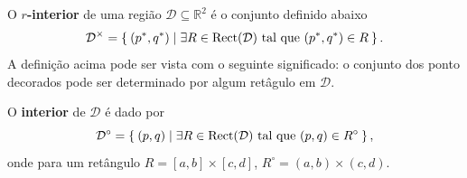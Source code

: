 O \textbf{$r$-interior} de uma região $\mathcal{D} \subseteq \mathbb{R}^2$ é o conjunto definido abaixo
\begin{equation*}
    \mathcal{D}^\times = \Set{(p^*, q^*) | \exists R \in \text{Rect}(\mathcal{D}) \text{ tal que }
    (p^*, q^*) \in R}.
\end{equation*}
A definição acima pode ser vista com o seguinte significado: o conjunto dos ponto decorados pode ser 
determinado por algum retâgulo em $\mathcal{D}$. 

O \textbf{interior} de $\mathcal{D}$ é dado por 
\begin{equation*}
    \mathcal{D}^\circ = \Set{(p,q) | \exists R \in \text{Rect}(\mathcal{D}) \text{ tal que } 
    (p,q) \in R^\circ},
\end{equation*}
onde para um retângulo $R = [a,b]\times[c,d]$, $R^\circ = (a,b)\times(c,d)$. 

